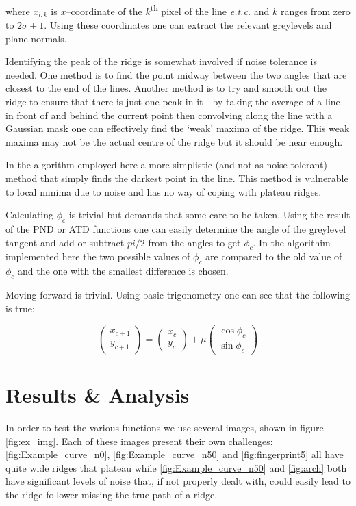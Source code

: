 \documentclass[11pt,a4paper]{article}
\begin{document}
\begin{multicols}{2}
		where $x_{l,k}$ is $x$--coordinate of the $k$\textsuperscript{th} pixel of the line \textit{e.t.c.} and $k$ ranges from zero to $2 \sigma + 1$. Using these coordinates one can extract the relevant greylevels and plane normals.

		Identifying the peak of the ridge is somewhat involved if noise tolerance is needed. One method is to find the point midway between the two angles that are closest to the end of the lines. Another method is to try and smooth out the ridge to ensure that there is just one peak in it - by taking the average of a line in front of and behind the current point then convolving along the line with a Gaussian mask one can effectively find the `weak' maxima of the ridge. This weak maxima may not be the actual centre of the ridge but it should be near enough.

In the algorithm employed here a more simplistic (and not as noise tolerant) method that simply finds the darkest point in the line. This method is vulnerable to local minima due to noise and has no way of coping with plateau ridges.

		Calculating $\phi_c$ is trivial but demands that some care to be taken. Using the result of the PND or ATD functions one can easily determine the angle of the greylevel tangent and add or subtract $pi/2$ from the angles to get $\phi_c$. In the algorithim implemented here the two possible values of $\phi_c$ are compared to the old value of $\phi_c$ and the one with the smallest difference is chosen.

		Moving forward is trivial. Using basic trigonometry one can see that the following is true:

		\begin{equation}
			\begin{pmatrix}
			x_{c+1} \\
			y_{c+1}
			\end{pmatrix}
			=
			\begin{pmatrix}
			x_c \\
			y_c
			\end{pmatrix}
			+ \mu
			\begin{pmatrix}
			\cos{\phi_c} \\
			\sin{\phi_c}
			\end{pmatrix}
		\end{equation}

\section{Results \& Analysis}
	In order to test the various functions we use several images, shown in figure \ref{fig:ex_img}. Each of these images present their own challenges: \ref{fig:Example_curve_n0}, \ref{fig:Example_curve_n50} and \ref{fig:fingerprint5} all have quite wide ridges that plateau while \ref{fig:Example_curve_n50} and \ref{fig:arch} both have significant levels of noise that, if not properly dealt with, could easily lead to the ridge follower missing the true path of a ridge.


\end{multicols}
\end{document}
